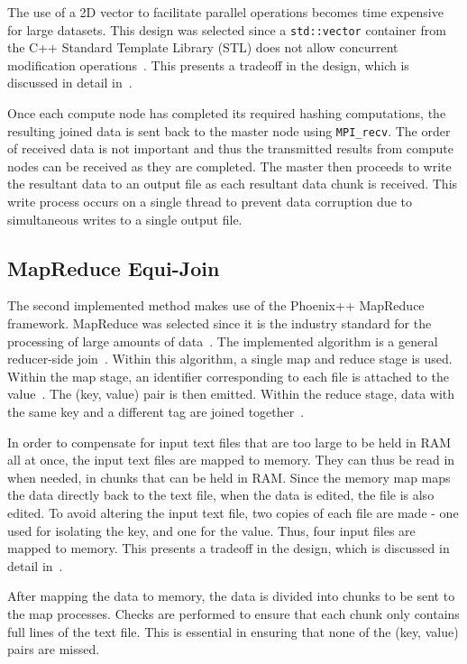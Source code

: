 \documentclass[12pt,twocolumn]{witseiepaper}
\begin{document}
The use of a 2D vector to facilitate parallel operations becomes time expensive for large datasets. This design was selected since a \texttt{std::vector} container from the C++ Standard Template Library (STL) does not allow concurrent modification operations~\cite{stl-vector}. This presents a tradeoff in the design, which is discussed in detail in~.

Once each compute node has completed its required hashing computations, the resulting joined data is sent back to the master node using \texttt{MPI\_recv}. The order of received data is not important and thus the transmitted results from compute nodes can be received as they are completed. The master then proceeds to write the resultant data to an output file as each resultant data chunk is received. This write process occurs on a single thread to prevent data corruption due to simultaneous writes to a single output file.

\subsection{MapReduce Equi-Join}
The second implemented method makes use of the Phoenix++ MapReduce framework. MapReduce was selected since it is the industry standard for the processing of large amounts of data~\cite{comparingMPIMapReduce}. The implemented algorithm is a general reducer-side join~\cite{mapReduceJoin}. Within this algorithm, a single map and reduce stage is used. Within the map stage, an identifier corresponding to each file is attached to the value~\cite{mapReduceJoin}. The (key, value) pair is then emitted. Within the reduce stage, data with the same key and a different tag are joined together~\cite{mapReduceJoin}.

In order to compensate for input text files that are too large to be held in RAM all at once, the input text files are mapped to memory. They can thus be read in when needed, in chunks that can be held in RAM. Since the memory map maps the data directly back to the text file, when the data is edited, the file is also edited. To avoid altering the input text file, two copies of each file are made - one used for isolating the key, and one for the value. Thus, four input files are mapped to memory. This presents a tradeoff in the design, which is discussed in detail in~.

After mapping the data to memory, the data is divided into chunks to be sent to the map processes. Checks are performed to ensure that each chunk only contains full lines of the text file. This is essential in ensuring that none of the (key, value) pairs are missed.
\end{document}
